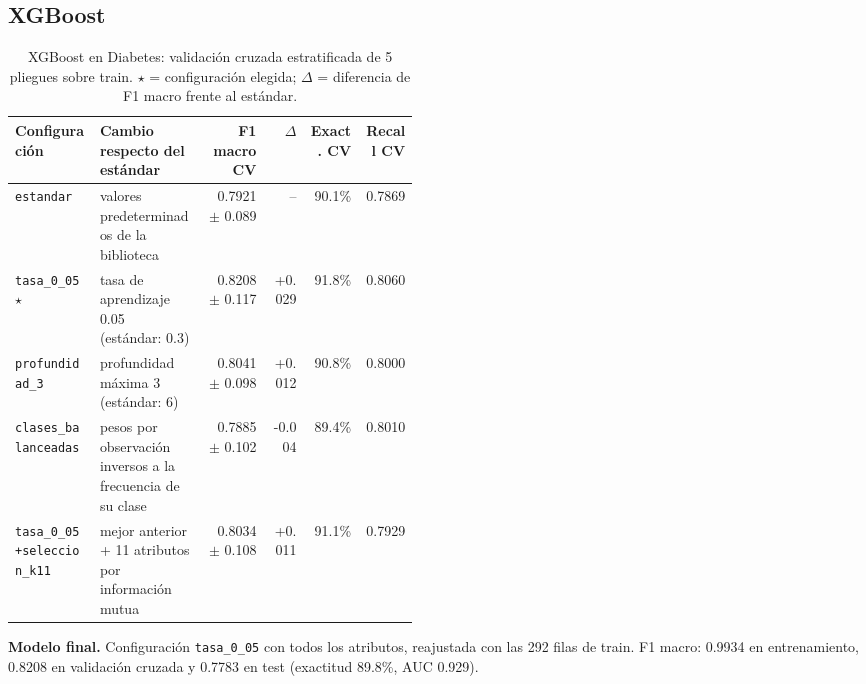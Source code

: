 \documentclass[11pt]{article}
\begin{document}
\FloatBarrier

\subsection{XGBoost}

\begin{table}[H]\centering\footnotesize
\caption{XGBoost en Diabetes: validación cruzada estratificada de 5 pliegues sobre train. $\star$ = configuración elegida; $\Delta$ = diferencia de F1 macro frente al estándar.}
\begin{tabular}{>{\raggedright\arraybackslash}p{0.21\linewidth}>{\raggedright\arraybackslash}p{0.26\linewidth}rrrr}\toprule
Configuración & Cambio respecto del estándar & F1 macro CV & $\Delta$ & Exact. CV & Recall CV \\ \midrule
\texttt{estandar} & valores predeterminados de la biblioteca & 0.7921 $\pm$ 0.089 & -- & 90.1\% & 0.7869 \\
\texttt{tasa\_\allowbreak{}0\_\allowbreak{}05} $\star$ & tasa de aprendizaje 0.05 (estándar: 0.3) & 0.8208 $\pm$ 0.117 & +0.029 & 91.8\% & 0.8060 \\
\texttt{profundidad\_\allowbreak{}3} & profundidad máxima 3 (estándar: 6) & 0.8041 $\pm$ 0.098 & +0.012 & 90.8\% & 0.8000 \\
\texttt{clases\_\allowbreak{}balanceadas} & pesos por observación inversos a la frecuencia de su clase & 0.7885 $\pm$ 0.102 & -0.004 & 89.4\% & 0.8010 \\
\texttt{tasa\_\allowbreak{}0\_\allowbreak{}05+\allowbreak{}seleccion\_\allowbreak{}k11} & mejor anterior + 11 atributos por información mutua & 0.8034 $\pm$ 0.108 & +0.011 & 91.1\% & 0.7929 \\
\bottomrule\end{tabular}
\end{table}

\textbf{Modelo final.} Configuración \texttt{tasa\_\allowbreak{}0\_\allowbreak{}05} con todos los atributos, reajustada con las 292 filas de train. F1 macro: 0.9934 en entrenamiento, 0.8208 en validación cruzada y 0.7783 en test (exactitud 89.8\%, AUC 0.929).
\end{document}
